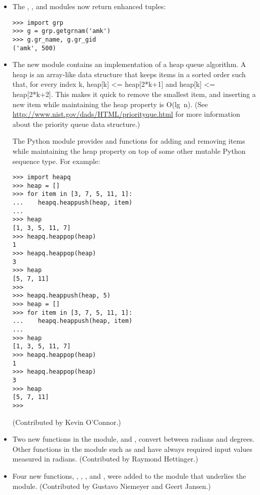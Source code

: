 \documentclass{howto}
\begin{document}
\begin{itemize}
\item The , , and  modules
now return enhanced tuples: 

\begin{verbatim}
>>> import grp
>>> g = grp.getgrnam('amk')
>>> g.gr_name, g.gr_gid
('amk', 500)
\end{verbatim}

\item The new  module contains an implementation of a
heap queue algorithm.  A heap is an array-like data structure that
keeps items in a sorted order such that, for every index k, heap[k] <=
heap[2*k+1] and heap[k] <= heap[2*k+2].  This makes it quick to remove
the smallest item, and inserting a new item while maintaining the heap
property is O(lg~n).  (See
\url{http://www.nist.gov/dads/HTML/priorityque.html} for more
information about the priority queue data structure.)

The Python  module provides  and
 functions for adding and removing items while
maintaining the heap property on top of some other mutable Python
sequence type.  For example:

\begin{verbatim}
>>> import heapq
>>> heap = []
>>> for item in [3, 7, 5, 11, 1]:
...    heapq.heappush(heap, item)
...
>>> heap
[1, 3, 5, 11, 7]
>>> heapq.heappop(heap)
1
>>> heapq.heappop(heap)
3
>>> heap
[5, 7, 11]
>>>
>>> heapq.heappush(heap, 5)
>>> heap = []
>>> for item in [3, 7, 5, 11, 1]:
...    heapq.heappush(heap, item)
...
>>> heap
[1, 3, 5, 11, 7]
>>> heapq.heappop(heap)
1
>>> heapq.heappop(heap)
3
>>> heap
[5, 7, 11]
>>>
\end{verbatim}

(Contributed by Kevin O'Connor.)

\item Two new functions in the  module, 
 and ,
convert between radians and degrees.  Other functions in the 
 module such as
 and  have always required
input values measured in radians. (Contributed by Raymond Hettinger.)

\item Four new functions, , , , and , were added to the  module that
underlies the  module.  (Contributed by Gustavo Niemeyer
and Geert Jansen.)


\end{itemize}
\end{document}

